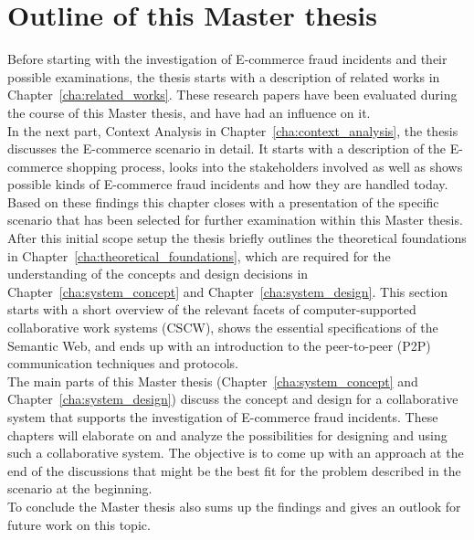 
\section{Outline of this Master thesis}
\label{sec:thesis_outline}

Before starting with the investigation of \gls{E-commerce} fraud incidents and their possible examinations, the thesis starts with a description of related works in Chapter~\ref{cha:related_works}. These research papers have been evaluated during the course of this Master thesis, and have had an influence on it. \\

In the next part, Context Analysis in Chapter~\ref{cha:context_analysis}, the thesis discusses the \gls{E-commerce} scenario in detail. It starts with a description of the \gls{E-commerce} shopping process, looks into the stakeholders involved as well as shows possible kinds of \gls{E-commerce} fraud incidents and how they are handled today. Based on these findings this chapter closes with a presentation of the specific scenario that has been selected for further examination within this Master thesis. \\

After this initial scope setup the thesis briefly outlines the theoretical foundations in Chapter~\ref{cha:theoretical_foundations}, which are required for the understanding of the concepts and design decisions in Chapter~\ref{cha:system_concept} and Chapter~\ref{cha:system_design}. This section starts with a short overview of the relevant facets of computer-supported collaborative work systems (\gls{CSCW}), shows the essential specifications of the Semantic Web, and ends up with an introduction to the peer-to-peer (\gls{P2P}) communication techniques and protocols. \\

The main parts of this Master thesis (Chapter~\ref{cha:system_concept} and Chapter~\ref{cha:system_design}) discuss the concept and design for a collaborative system that supports the investigation of \gls{E-commerce} fraud incidents. These chapters will elaborate on and analyze the possibilities for designing and using such a collaborative system. The objective is to come up with an approach at the end of the discussions that might be the best fit for the problem described in the scenario at the beginning. \\

To conclude the Master thesis also sums up the findings and gives an outlook for future work on this topic.

